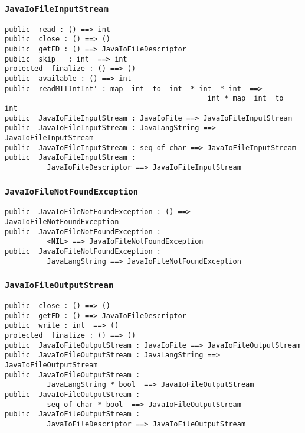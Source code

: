 \documentclass[\pformat,12pt]{article}
\begin{document}
\subsubsection{\texttt{JavaIoFileInputStream}}
\begin{small}
\begin{verbatim}
public  read : () ==> int
public  close : () ==> ()
public  getFD : () ==> JavaIoFileDescriptor
public  skip__ : int  ==> int
protected  finalize : () ==> ()
public  available : () ==> int
public  readMIIIntInt' : map  int  to  int  * int  * int  ==> 
                                                int * map  int  to  int
public  JavaIoFileInputStream : JavaIoFile ==> JavaIoFileInputStream
public  JavaIoFileInputStream : JavaLangString ==> JavaIoFileInputStream
public  JavaIoFileInputStream : seq of char ==> JavaIoFileInputStream
public  JavaIoFileInputStream : 
          JavaIoFileDescriptor ==> JavaIoFileInputStream
\end{verbatim}
\end{small}

\subsubsection{\texttt{JavaIoFileNotFoundException}}
\begin{small}
\begin{verbatim}
public  JavaIoFileNotFoundException : () ==> JavaIoFileNotFoundException
public  JavaIoFileNotFoundException : 
          <NIL> ==> JavaIoFileNotFoundException
public  JavaIoFileNotFoundException : 
          JavaLangString ==> JavaIoFileNotFoundException
\end{verbatim}
\end{small}

\subsubsection{\texttt{JavaIoFileOutputStream}}
\begin{small}
\begin{verbatim}
public  close : () ==> ()
public  getFD : () ==> JavaIoFileDescriptor
public  write : int  ==> ()
protected  finalize : () ==> ()
public  JavaIoFileOutputStream : JavaIoFile ==> JavaIoFileOutputStream
public  JavaIoFileOutputStream : JavaLangString ==> JavaIoFileOutputStream
public  JavaIoFileOutputStream : 
          JavaLangString * bool  ==> JavaIoFileOutputStream
public  JavaIoFileOutputStream : 
          seq of char * bool  ==> JavaIoFileOutputStream
public  JavaIoFileOutputStream : 
          JavaIoFileDescriptor ==> JavaIoFileOutputStream
\end{verbatim}
\end{small}
\end{document}

